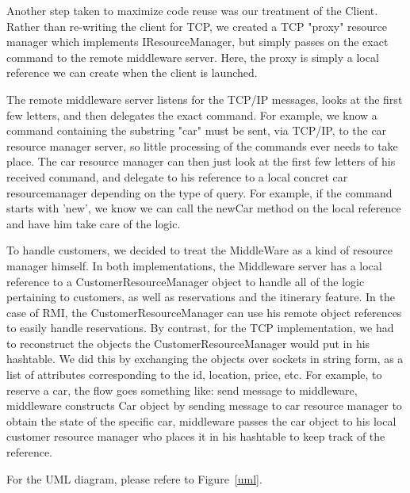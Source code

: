 \documentclass[a4paper]{article}
\begin{document}
Another step taken to maximize code reuse was our treatment of the Client. Rather than re-writing the client for TCP, we created a TCP "proxy" resource
manager which implements IResourceManager, but simply passes on the exact command to the remote middleware server. Here, the proxy is simply a local
reference we can create when the client is launched.


The remote middleware server listens for the TCP/IP messages, looks at the first few letters, and 
then delegates the exact command. For example, we know a command containing the substring "car" must be sent, via TCP/IP, to the car resource manager server,
so little processing of the commands ever needs to take place. The car resource manager can then just look at the first few letters of his received command,
and delegate to his reference to a local concret car resourcemanager depending on the type of query. For example, if the command starts with 'new', we know
we can call the newCar method on the local reference and have him take care of the logic. 


To handle customers, we decided to treat the MiddleWare as a kind of resource manager himself. In both implementations, the Middleware server has a local reference
to a CustomerResourceManager object to handle all of the logic pertaining to customers, as well as reservations and the itinerary feature. In the case of RMI,
the CustomerResourceManager can use his remote object references to easily handle reservations. By contrast, for the TCP implementation, we had to reconstruct 
the objects the CustomerResourceManager would put in his hashtable. We did this by exchanging the objects over sockets in string form, as a list of attributes
corresponding to the id, location, price, etc. For example, to reserve a car, the flow goes something like: send message to middleware, middleware constructs Car
object by sending message to car resource manager to obtain the state of the specific car, middleware passes the car object to his local customer resource manager
who places it in his hashtable to keep track of the reference. 


For the UML diagram, please refere to Figure~\ref{uml}.
\end{document}
